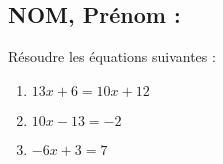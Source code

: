 \documentclass[a4paper,11pt,exos]{nsi} %
\begin{document}
\subsection*{NOM, Prénom : \dotfill} 


\maketitle




\begin{exercice}
Résoudre les équations suivantes :
\begin{multicols}{3}
	\begin{enumerate}
		\item $13x+6=10x+12$
		\item $10x-13=-2$
		\item $-6x+3=7$
	\end{enumerate}
\end{multicols}

\end{exercice}

\end{document}
